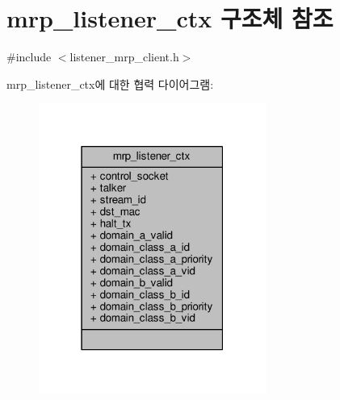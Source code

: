 \hypertarget{structmrp__listener__ctx}{}\section{mrp\+\_\+listener\+\_\+ctx 구조체 참조}
\label{structmrp__listener__ctx}


{\ttfamily \#include $<$listener\+\_\+mrp\+\_\+client.\+h$>$}



mrp\+\_\+listener\+\_\+ctx에 대한 협력 다이어그램\+:
\nopagebreak
\begin{figure}[H]
\begin{center}
\leavevmode
\includegraphics[width=211pt]{structmrp__listener__ctx__coll__graph}
\end{center}
\end{figure}
